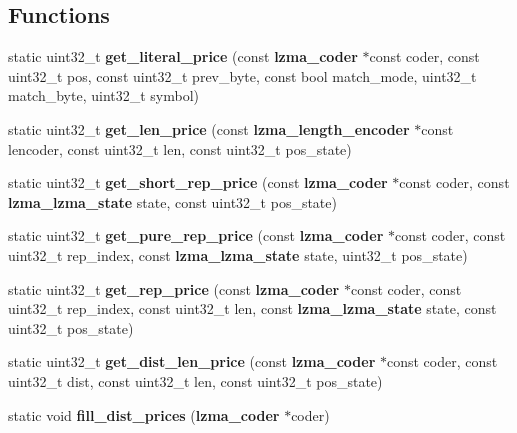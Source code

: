 \subsection*{Functions}
\begin{DoxyCompactItemize}
\item 
static uint32\-\_\-t {\bfseries get\-\_\-literal\-\_\-price} (const {\bf lzma\-\_\-coder} $\ast$const coder, const uint32\-\_\-t pos, const uint32\-\_\-t prev\-\_\-byte, const bool match\-\_\-mode, uint32\-\_\-t match\-\_\-byte, uint32\-\_\-t symbol)\label{lzma__encoder__optimum__normal_8c_a679cccbf55ea060964ae83b5d62f459a}

\item 
static uint32\-\_\-t {\bfseries get\-\_\-len\-\_\-price} (const {\bf lzma\-\_\-length\-\_\-encoder} $\ast$const lencoder, const uint32\-\_\-t len, const uint32\-\_\-t pos\-\_\-state)\label{lzma__encoder__optimum__normal_8c_ae75cbe3127b0374907614a13ac391806}

\item 
static uint32\-\_\-t {\bfseries get\-\_\-short\-\_\-rep\-\_\-price} (const {\bf lzma\-\_\-coder} $\ast$const coder, const {\bf lzma\-\_\-lzma\-\_\-state} state, const uint32\-\_\-t pos\-\_\-state)\label{lzma__encoder__optimum__normal_8c_ae673d192b93f7502ff881e64b8fe24e2}

\item 
static uint32\-\_\-t {\bfseries get\-\_\-pure\-\_\-rep\-\_\-price} (const {\bf lzma\-\_\-coder} $\ast$const coder, const uint32\-\_\-t rep\-\_\-index, const {\bf lzma\-\_\-lzma\-\_\-state} state, uint32\-\_\-t pos\-\_\-state)\label{lzma__encoder__optimum__normal_8c_af2b6ae60e680aa7a429a29a5a22d96cb}

\item 
static uint32\-\_\-t {\bfseries get\-\_\-rep\-\_\-price} (const {\bf lzma\-\_\-coder} $\ast$const coder, const uint32\-\_\-t rep\-\_\-index, const uint32\-\_\-t len, const {\bf lzma\-\_\-lzma\-\_\-state} state, const uint32\-\_\-t pos\-\_\-state)\label{lzma__encoder__optimum__normal_8c_a2104d8b912973fb059ac130b68a11a17}

\item 
static uint32\-\_\-t {\bfseries get\-\_\-dist\-\_\-len\-\_\-price} (const {\bf lzma\-\_\-coder} $\ast$const coder, const uint32\-\_\-t dist, const uint32\-\_\-t len, const uint32\-\_\-t pos\-\_\-state)\label{lzma__encoder__optimum__normal_8c_a21277790207181054715c966854ccbcf}

\item 
static void {\bfseries fill\-\_\-dist\-\_\-prices} ({\bf lzma\-\_\-coder} $\ast$coder)\label{lzma__encoder__optimum__normal_8c_acd5a6d27d66a66821c1586ca712d67e7}


\end{DoxyCompactItemize}
